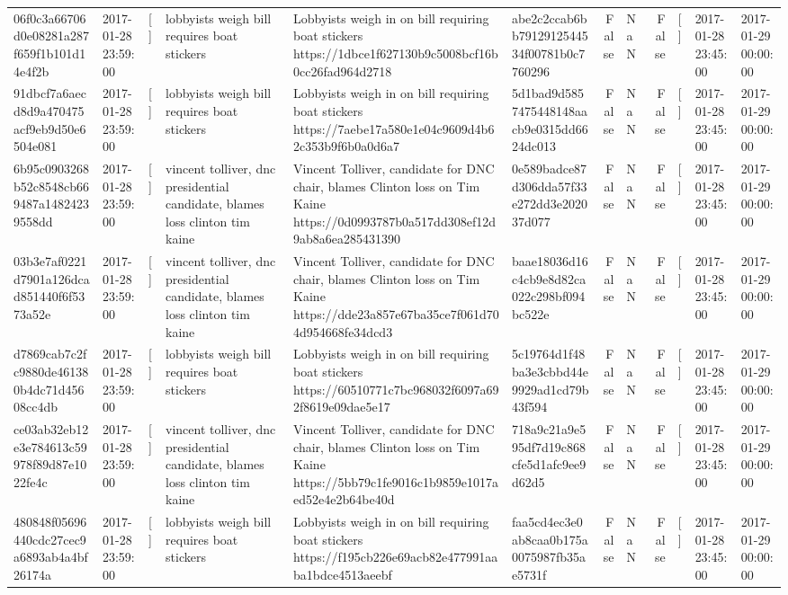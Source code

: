 \begin{tabular}{llllllrlrlll}
06f0c3a66706d0e08281a287f659f1b101d14e4f2b & 2017-01-28 23:59:00 & [] & lobbyists weigh bill requires boat stickers & Lobbyists weigh in on bill requiring boat stickers https://1dbce1f627130b9c5008bcf16b0cc26fad964d2718 & abe2c2ccab6bb7912912544534f00781b0c7760296 & False & NaN & False & [] & 2017-01-28 23:45:00 & 2017-01-29 00:00:00 \\
91dbcf7a6aecd8d9a470475acf9eb9d50e6504e081 & 2017-01-28 23:59:00 & [] & lobbyists weigh bill requires boat stickers & Lobbyists weigh in on bill requiring boat stickers https://7aebe17a580e1e04c9609d4b62c353b9f6b0a0d6a7 & 5d1bad9d5857475448148aacb9e0315dd6624dc013 & False & NaN & False & [] & 2017-01-28 23:45:00 & 2017-01-29 00:00:00 \\
6b95c0903268b52c8548cb669487a14824239558dd & 2017-01-28 23:59:00 & [] & vincent tolliver, dnc presidential candidate, blames loss clinton tim kaine & Vincent Tolliver, candidate for DNC chair, blames Clinton loss on Tim Kaine https://0d0993787b0a517dd308ef12d9ab8a6ea285431390 & 0e589badce87d306dda57f33e272dd3e202037d077 & False & NaN & False & [] & 2017-01-28 23:45:00 & 2017-01-29 00:00:00 \\
03b3e7af0221d7901a126dcad851440f6f5373a52e & 2017-01-28 23:59:00 & [] & vincent tolliver, dnc presidential candidate, blames loss clinton tim kaine & Vincent Tolliver, candidate for DNC chair, blames Clinton loss on Tim Kaine https://dde23a857e67ba35ce7f061d704d954668fe34dcd3 & baae18036d16c4cb9e8d82ca022c298bf094bc522e & False & NaN & False & [] & 2017-01-28 23:45:00 & 2017-01-29 00:00:00 \\
d7869cab7c2fc9880de461380b4dc71d45608cc4db & 2017-01-28 23:59:00 & [] & lobbyists weigh bill requires boat stickers & Lobbyists weigh in on bill requiring boat stickers https://60510771c7bc968032f6097a692f8619e09dae5e17 & 5c19764d1f48ba3e3cbbd44e9929ad1cd79b43f594 & False & NaN & False & [] & 2017-01-28 23:45:00 & 2017-01-29 00:00:00 \\
ce03ab32eb12e3e784613c59978f89d87e1022fe4c & 2017-01-28 23:59:00 & [] & vincent tolliver, dnc presidential candidate, blames loss clinton tim kaine & Vincent Tolliver, candidate for DNC chair, blames Clinton loss on Tim Kaine https://5bb79c1fe9016c1b9859e1017aed52e4e2b64be40d & 718a9c21a9e595df7d19c868cfe5d1afc9ee9d62d5 & False & NaN & False & [] & 2017-01-28 23:45:00 & 2017-01-29 00:00:00 \\
480848f05696440cdc27cec9a6893ab4a4bf26174a & 2017-01-28 23:59:00 & [] & lobbyists weigh bill requires boat stickers & Lobbyists weigh in on bill requiring boat stickers https://f195cb226e69acb82e477991aaba1bdce4513aeebf & faa5cd4ec3e0ab8caa0b175a0075987fb35ae5731f & False & NaN & False & [] & 2017-01-28 23:45:00 & 2017-01-29 00:00:00 \\

\end{tabular}
